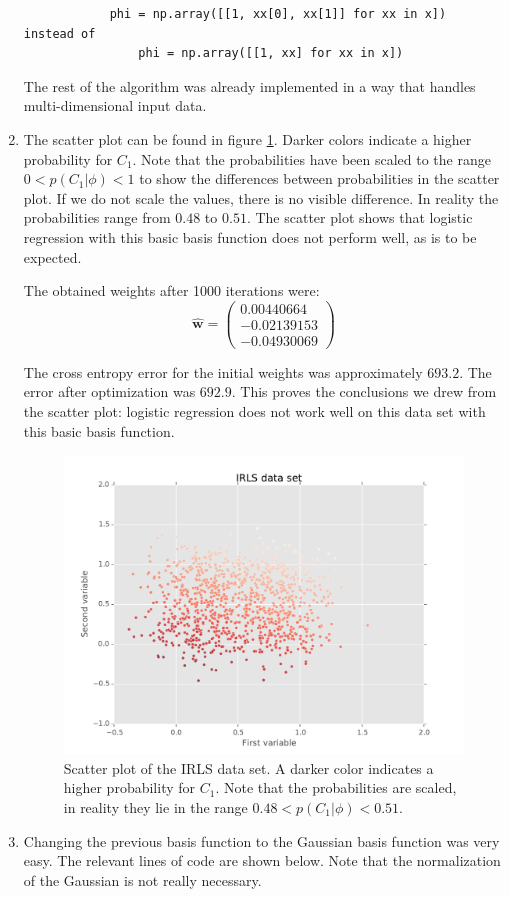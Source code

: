 \documentclass[paper=a4, fontsize=10pt]{scrartcl} %
\numberwithin{equation}{section} %
\numberwithin{figure}{section} %
\numberwithin{table}{section} %
\begin{document}
\begin{enumerate}
\begin{verbatim}
			phi = np.array([[1, xx[0], xx[1]] for xx in x])    instead of    
			    phi = np.array([[1, xx] for xx in x])
		\end{verbatim}
		The rest of the algorithm was already implemented in a way that handles multi-dimensional input data.
	\item
		The scatter plot can be found in figure \ref{scatter_dummy}. Darker colors indicate a higher probability for $C_1$. Note that the probabilities have been scaled to the range $0 < p(C_1 \vert \phi) < 1$ to show the differences between probabilities in the scatter plot. If we do not scale the values, there is no visible difference. In reality the probabilities range from $0.48$ to $0.51$. The scatter plot shows that logistic regression with this basic basis function does not perform well, as is to be expected.

		The obtained weights after 1000 iterations were:
		\begin{equation}
			\boldsymbol {\hat w} = \begin{pmatrix}
						0.00440664\\
						-0.02139153\\
						-0.04930069
					 \end{pmatrix}
		\end{equation}

		The cross entropy error for the initial weights was approximately $693.2$. The error after optimization was $692.9$.
		This proves the conclusions we drew from the scatter plot: logistic regression does not work well on this data set with this basic basis function.

		\begin{figure}[H]
			\centering
			\includegraphics[scale=0.75]{exercise_223.pdf}
			\caption{Scatter plot of the IRLS data set. A darker color indicates a higher probability for $C_1$. Note that the probabilities are scaled, in reality they lie in the range $0.48 < p(C_1 \vert \phi) < 0.51$.}
			\label{scatter_dummy}
		\end{figure}
	\item
		Changing the previous basis function to the Gaussian basis function was very easy. The relevant lines of code are shown below. Note that the normalization of the Gaussian is not really necessary.


\end{enumerate}
\end{document}
